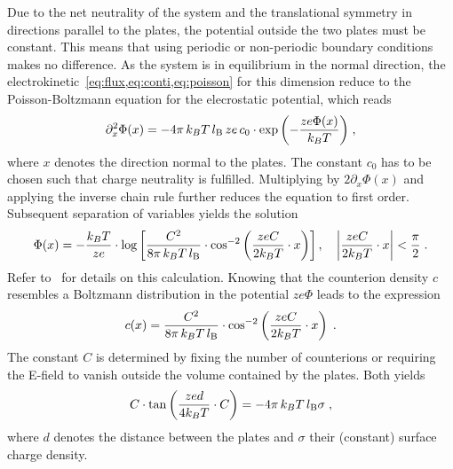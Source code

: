 Due to the net neutrality of the system and the
translational symmetry in directions parallel to the plates, the potential
outside the two plates must be constant. This means that using periodic or
non-periodic boundary conditions makes no difference. As the system is in equilibrium in the normal direction, the electrokinetic~\cref{eq:flux,eq:conti,eq:poisson} for this dimension reduce to the Poisson-Boltzmann equation for the elecrostatic potential, which reads
\begin{align}
	\partial_x^2 \Phi(x) = -4 \pi \, \kT \, \lb \, ze \, c_0 \cdot \exp{\left(-\frac{ze\Phi(x)}{\kT}\right)} \; ,
\end{align}
where $x$ denotes the direction normal to the plates. The constant $c_0$ has to be chosen such that charge neutrality is fulfilled.
Multiplying by $2 \partial_x \Phi(x)$ and applying the
inverse chain rule further reduces the equation to first order. Subsequent
separation of variables yields the solution
\begin{align}
  \Phi(x) = -\frac{\kT}{ze} \cdot \log \left[ \frac{C^2}{8 \pi \, \kT \, \lb} \cdot \cos^{-2}\left( \frac{zeC}{2 \kT} \cdot x\right) \right], \quad \left| \frac{zeC}{2 \kT} \cdot x \right| < \frac \pi 2\; . \label{eq:validation_pb_counterions}
\end{align}
Refer to~\cite{rempfer10a} for details on this calculation.
Knowing that the counterion density $c$ resembles a Boltzmann distribution in the
potential $ze \Phi$ leads to the expression
\begin{align}
  c(x) = \frac{C^2}{8 \pi \, \kT \, \lb} \cdot \cos^{-2} \left( \frac{zeC}{2 \kT} \cdot x \right) \; . \label{eq:validation_pb_density}
\end{align}
The constant $C$ is determined by fixing the number of counterions or requiring
the E-field to vanish outside the volume contained by the plates. Both yields
\begin{align}
  C \cdot \tan \left( \frac{zed}{4 \kT} \cdot C \right) = -4 \pi \, \kT \, \lb \sigma \; ,
\end{align}
where $d$ denotes the distance between the plates and $\sigma$ their (constant) surface
charge density.

